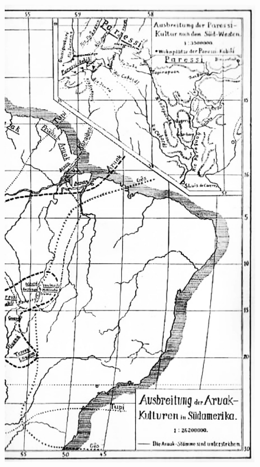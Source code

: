 \pagebreak
\thispagestyle{empty}

\begin{figure}[H]
\begin{absolutelynopagebreak}
\hspace*{-2cm}
  \includegraphics[width=\textwidth]{./MAPA_P2.pdf}  

\end{absolutelynopagebreak}
\end{figure}
